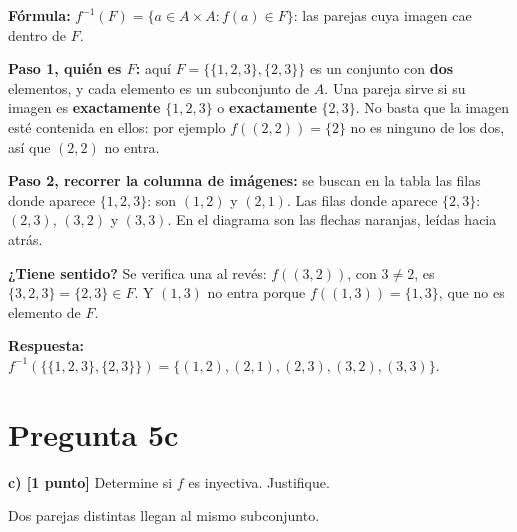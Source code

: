 \documentclass[11pt]{article}
\newcommand{\hl}[1]{\colorbox{green!35}{#1}}
\begin{document}

\begin{explica}
\textbf{Fórmula:} $f^{-1}(F)=\{a\in A\times A : f(a)\in F\}$: las parejas cuya imagen cae dentro de $F$.

\textbf{Paso 1, quién es $F$:} aquí $F=\{\{1,2,3\},\{2,3\}\}$ es un conjunto con \textbf{dos} elementos, y cada elemento es un subconjunto de $A$. Una pareja sirve si su imagen es \textbf{exactamente} $\{1,2,3\}$ o \textbf{exactamente} $\{2,3\}$. No basta que la imagen esté contenida en ellos: por ejemplo $f((2,2))=\{2\}$ no es ninguno de los dos, así que $(2,2)$ no entra.

\textbf{Paso 2, recorrer la columna de imágenes:} se buscan en la tabla las filas donde aparece $\{1,2,3\}$: son $(1,2)$ y $(2,1)$. Las filas donde aparece $\{2,3\}$: $(2,3)$, $(3,2)$ y $(3,3)$. En el diagrama son las flechas naranjas, leídas hacia atrás.

\textbf{¿Tiene sentido?} Se verifica una al revés: $f((3,2))$, con $3\neq2$, es $\{3,2,3\}=\{2,3\}\in F$. Y $(1,3)$ no entra porque $f((1,3))=\{1,3\}$, que no es elemento de $F$.
\end{explica}

\textbf{Respuesta:} $f^{-1}(\{\{1,2,3\},\{2,3\}\})=\{(1,2),(2,1),(2,3),(3,2),(3,3)\}$.

\clearpage
\section*{Pregunta 5c}

\textbf{c) [1 punto]} Determine si $f$ es \hl{inyectiva}. Justifique.

\begin{center}

{\small Dos parejas distintas llegan al mismo subconjunto.}
\end{center}

\end{document}
